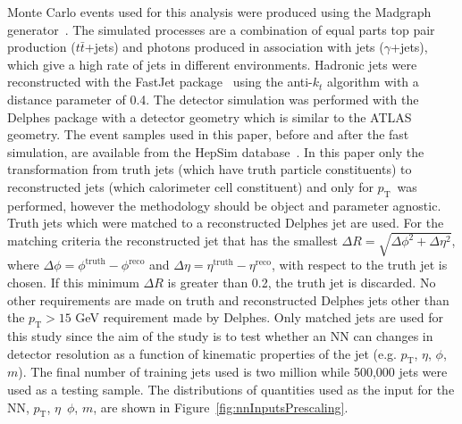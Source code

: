 \documentclass[showpacs,showkeys,preprint,prd,nofootinbib,linenumbers,12pt,superscriptaddress]{revtex4-1}
\def\pt{\ensuremath{p_{\mathrm{T}}}}
\begin{document}
Monte Carlo events used for this analysis were produced using the Madgraph generator~\cite{Alwall:2014hca}. The simulated processes are a combination of equal parts top pair production ($t\bar{t}$+jets) and photons produced in association with jets ($\gamma$+jets), which give a high rate of jets in different environments. 
Hadronic jets were reconstructed with the {\sc FastJet} package~\cite{Fastjet} using the anti-$k_t$ algorithm \cite{Cacciari:2008gp} with a distance parameter of 0.4. The detector simulation was performed with the Delphes package with a detector geometry which is similar to the ATLAS geometry. 
The event samples used in this paper, before and after the fast simulation, are available from the HepSim database~\cite{Chekanov:2014fga}. In this paper only the transformation from truth jets (which have truth particle constituents) to reconstructed jets (which calorimeter cell constituent) and only for \pt\ was performed, however the methodology should be object and parameter agnostic. Truth jets which were matched to a reconstructed Delphes jet are used. For the matching criteria the reconstructed jet that has the smallest $\Delta R=\sqrt{\Delta\phi^2+\Delta\eta^2}$, where $\Delta\phi=\phi^{\text{truth}}-\phi^{\text{reco}}$ and $\Delta\eta=\eta^{\text{truth}}-\eta^{\text{reco}}$, with respect to the truth jet is chosen. If this minimum $\Delta R$ is greater than 0.2, the truth jet is discarded. No other requirements are made on truth and reconstructed Delphes jets other than the $\pt>15$ GeV requirement made by Delphes. Only matched jets are used for this study since the aim of the study is to test whether an NN can changes in detector resolution as a function of kinematic properties of the jet (e.g. $\pt$, $\eta$, $\phi$, $m$). 
The final number of training jets used is two million while 500,000 jets were used as a testing sample. The distributions of quantities used as the input for the NN, \pt, $\eta$\, $\phi$, $m$, are shown in Figure~\ref{fig:nnInputsPrescaling}.
\end{document}
